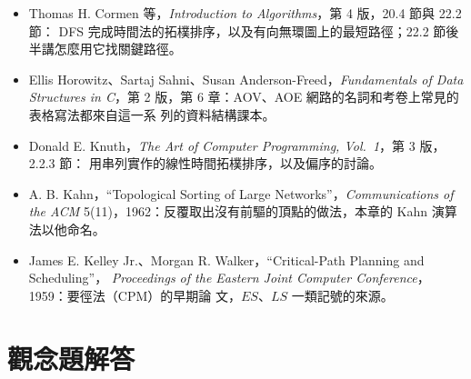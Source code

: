 \begin{itemize}
\item Thomas H. Cormen 等，\textit{Introduction to Algorithms}，第 4 版，20.4 節與 22.2 節：
DFS 完成時間法的拓樸排序，以及有向無環圖上的最短路徑；22.2 節後半講怎麼用它找關鍵路徑。
\item Ellis Horowitz、Sartaj Sahni、Susan Anderson-Freed，\textit{Fundamentals of Data
Structures in C}，第 2 版，第 6 章：AOV、AOE 網路的名詞和考卷上常見的表格寫法都來自這一系
列的資料結構課本。
\item Donald E. Knuth，\textit{The Art of Computer Programming, Vol.~1}，第 3 版，2.2.3 節：
用串列實作的線性時間拓樸排序，以及偏序的討論。
\item A. B. Kahn，``Topological Sorting of Large Networks''，\textit{Communications of the
ACM} 5(11)，1962：反覆取出沒有前驅的頂點的做法，本章的 Kahn 演算法以他命名。
\item James E. Kelley Jr.、Morgan R. Walker，``Critical-Path Planning and Scheduling''，
\textit{Proceedings of the Eastern Joint Computer Conference}，1959：要徑法（CPM）的早期論
文，$\mathit{ES}$、$\mathit{LS}$ 一類記號的來源。
\end{itemize}

\section*{觀念題解答}

